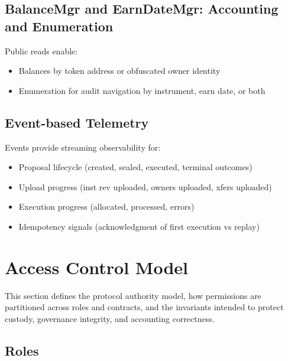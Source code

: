 \documentclass[10pt]{article}
\begin{document}
\subsection{BalanceMgr and EarnDateMgr: Accounting and Enumeration}
Public reads enable:

\begin{itemize}
    \item Balances by token address or obfuscated owner identity
    \item Enumeration for audit navigation by instrument, earn date, or both
\end{itemize}

\subsection{Event-based Telemetry}
Events provide streaming observability for:

\begin{itemize}
    \item Proposal lifecycle (created, sealed, executed, terminal outcomes)
    \item Upload progress (inst rev uploaded, owners uploaded, xfers uploaded)
    \item Execution progress (allocated, processed, errors)
    \item Idempotency signals (acknowledgment of first execution vs replay)
\end{itemize}

\clearpage
\section{Access Control Model}
This section defines the protocol authority model, how permissions are partitioned across roles and contracts, and the invariants intended to protect custody, governance integrity, and accounting correctness.

\subsection{Roles}
\end{document}
